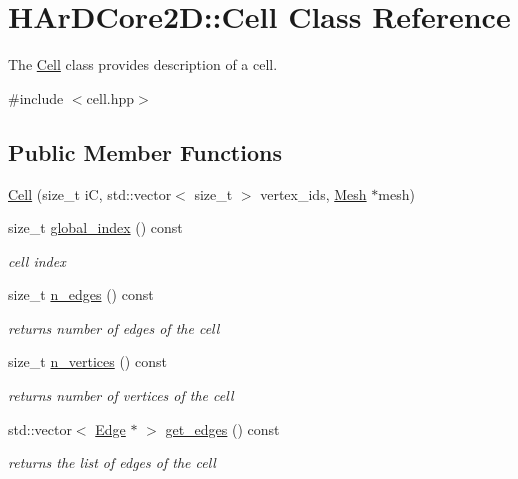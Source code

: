 \hypertarget{classHArDCore2D_1_1Cell}{}\section{H\+Ar\+D\+Core2D\+:\+:Cell Class Reference}
\label{classHArDCore2D_1_1Cell}


The \hyperlink{classHArDCore2D_1_1Cell}{Cell} class provides description of a cell.  




{\ttfamily \#include $<$cell.\+hpp$>$}

\subsection*{Public Member Functions}
\begin{DoxyCompactItemize}
\item 
\hyperlink{classHArDCore2D_1_1Cell_a419647e4f50c110f473ada556ef7a944}{Cell} (size\+\_\+t iC, std\+::vector$<$ size\+\_\+t $>$ vertex\+\_\+ids, \hyperlink{classHArDCore2D_1_1Mesh}{Mesh} $\ast$mesh)
\item 
size\+\_\+t \hyperlink{group__Mesh_ga36d093e9886bcd4befae4ddf5f75f2ee}{global\+\_\+index} () const
\begin{DoxyCompactList}\small\item\em cell index \end{DoxyCompactList}\item 
size\+\_\+t \hyperlink{group__Mesh_ga1b0586610a05e1a7a64bbe11f59e9b19}{n\+\_\+edges} () const
\begin{DoxyCompactList}\small\item\em returns number of edges of the cell \end{DoxyCompactList}\item 
size\+\_\+t \hyperlink{group__Mesh_ga70f9744e4ff553db7f0e147342319f43}{n\+\_\+vertices} () const
\begin{DoxyCompactList}\small\item\em returns number of vertices of the cell \end{DoxyCompactList}\item 
\mbox{\label{classHArDCore2D_1_1Cell_abac3633d6b17df44320054664d9581b1}} 
std\+::vector$<$ \hyperlink{classHArDCore2D_1_1Edge}{Edge} $\ast$ $>$ \hyperlink{classHArDCore2D_1_1Cell_abac3633d6b17df44320054664d9581b1}{get\+\_\+edges} () const
\begin{DoxyCompactList}\small\item\em returns the list of edges of the cell \end{DoxyCompactList}\item 

\end{DoxyCompactItemize}

